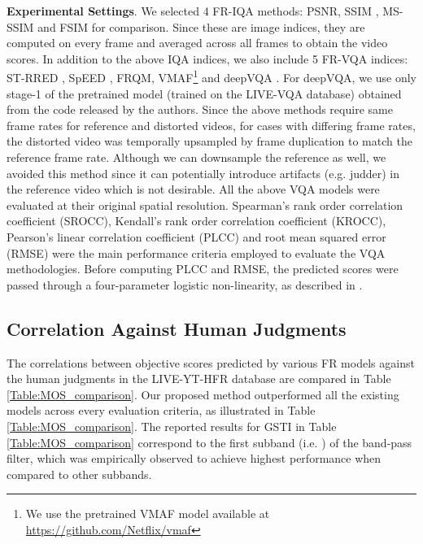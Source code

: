 \documentclass[journal]{IEEEtran}
\newcommand{\ie}{{i}.{e}.}
\newcommand{\eg}{{e}.{g}.}
\begin{document}
\textbf{Experimental Settings}.
We selected 4 FR-IQA methods: PSNR, SSIM \cite{wang2004image}, MS-SSIM \cite{wang2003multiscale} and FSIM \cite{zhang2011fsim} for comparison. Since these are image indices, they are computed on every frame and averaged across all frames to obtain the video scores. In addition to the above IQA indices, we also include 5 FR-VQA indices: ST-RRED \cite{soundararajan2012video}, SpEED \cite{bampis2017speed}, FRQM\cite{zhang2017frame}, VMAF\footnote{We use the pretrained VMAF model available at \url{https://github.com/Netflix/vmaf}} \cite{VMAF2016} and deepVQA \cite{kim2018deep}. For deepVQA, we use only stage-1 of the pretrained model (trained on the LIVE-VQA \cite{seshadrinathan2010study} database) obtained from the code released by the authors. Since the above methods require same frame rates for reference and distorted videos, for cases with differing frame rates, the distorted video was temporally upsampled by frame duplication to match the reference frame rate. Although we can downsample the reference as well, we avoided this method since it can potentially introduce artifacts (\eg{ } judder) in the reference video which is not desirable. All the above VQA models were evaluated at their original spatial resolution. Spearman's rank order correlation coefficient (SROCC), Kendall's rank order correlation coefficient (KROCC), Pearson's linear correlation coefficient (PLCC) and root mean squared error (RMSE) were the main performance criteria employed to evaluate the VQA methodologies. Before computing PLCC and RMSE, the predicted scores were passed through a four-parameter logistic non-linearity, as described in \cite{VQEG2000}.




\vspace{-7pt}
\subsection{Correlation Against Human Judgments}
The correlations between objective scores predicted by various FR models against the human judgments in the LIVE-YT-HFR database are compared in Table \ref{Table:MOS_comparison}. Our proposed method outperformed all the existing models across every evaluation criteria, as illustrated in Table \ref{Table:MOS_comparison}. The reported results for GSTI in Table \ref{Table:MOS_comparison} correspond to the first subband (\ie{ }) of the band-pass filter, which was empirically observed to achieve highest performance when compared to other subbands. 
\end{document}
